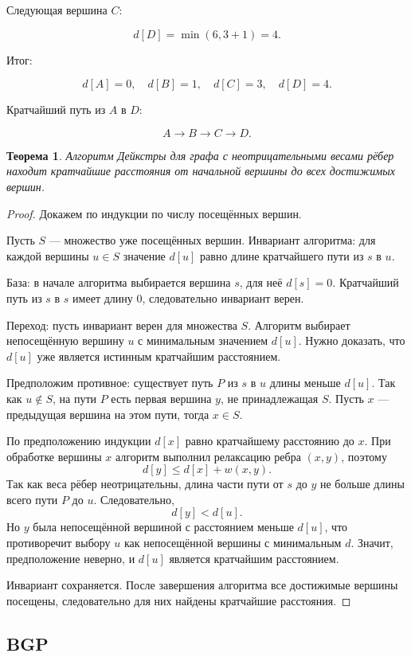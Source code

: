 \documentclass[12pt,a4paper]{article}
\newtheorem{theorem}{Теорема}
\begin{document}
Следующая вершина $C$:

\[
d[D]=\min(6,3+1)=4.
\]

Итог:

\[
d[A]=0,\quad d[B]=1,\quad d[C]=3,\quad d[D]=4.
\]

Кратчайший путь из $A$ в $D$:

\[
A \rightarrow B \rightarrow C \rightarrow D.
\]

\begin{theorem}
Алгоритм Дейкстры для графа с неотрицательными весами рёбер находит кратчайшие расстояния от начальной вершины до всех достижимых вершин.
\end{theorem}

\begin{proof}
Докажем по индукции по числу посещённых вершин.

Пусть $S$ --- множество уже посещённых вершин. Инвариант алгоритма: для каждой вершины $u \in S$ значение $d[u]$ равно длине кратчайшего пути из $s$ в $u$.

База: в начале алгоритма выбирается вершина $s$, для неё $d[s]=0$. Кратчайший путь из $s$ в $s$ имеет длину 0, следовательно инвариант верен.

Переход: пусть инвариант верен для множества $S$. Алгоритм выбирает непосещённую вершину $u$ с минимальным значением $d[u]$. Нужно доказать, что $d[u]$ уже является истинным кратчайшим расстоянием.

Предположим противное: существует путь $P$ из $s$ в $u$ длины меньше $d[u]$. Так как $u \notin S$, на пути $P$ есть первая вершина $y$, не принадлежащая $S$. Пусть $x$ --- предыдущая вершина на этом пути, тогда $x \in S$.

По предположению индукции $d[x]$ равно кратчайшему расстоянию до $x$. При обработке вершины $x$ алгоритм выполнил релаксацию ребра $(x,y)$, поэтому
\[
d[y] \le d[x] + w(x,y).
\]
Так как веса рёбер неотрицательны, длина части пути от $s$ до $y$ не больше длины всего пути $P$ до $u$. Следовательно,
\[
d[y] < d[u].
\]
Но $y$ была непосещённой вершиной с расстоянием меньше $d[u]$, что противоречит выбору $u$ как непосещённой вершины с минимальным $d$. Значит, предположение неверно, и $d[u]$ является кратчайшим расстоянием.

Инвариант сохраняется. После завершения алгоритма все достижимые вершины посещены, следовательно для них найдены кратчайшие расстояния.
\end{proof}

\subsection{BGP}
\end{document}
